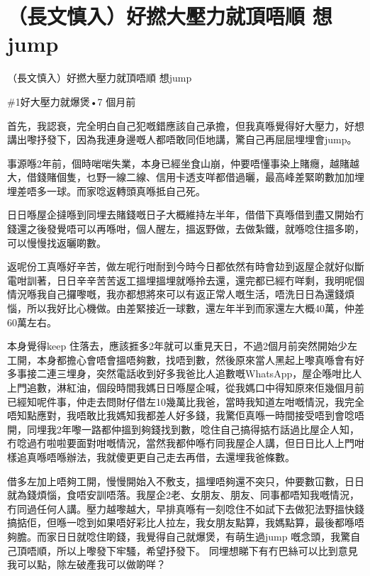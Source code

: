 \chapter{（長文慎入）好撚大壓力就頂唔順 想jump}

（長文慎入）好撚大壓力就頂唔順 想jump

\#1好大壓力就爆煲•7 個月前

首先，我認衰，完全明白自己犯嘅錯應該自己承擔，但我真喺覺得好大壓力，好想講出嚟抒發下，因為我連身邊嘅人都唔敢同佢地講，驚自己再屈屈埋埋會jump。

事源喺2年前，個時啱啱失業，本身已經坐食山崩，仲要唔懂事染上賭癮，越賭越大，借錢賭個隻，乜野一線二線、信用卡透支咩都借過曬，最高峰差緊啲數加加埋埋差唔多一球。而家唸返轉頭真喺抵自己死。

日日喺屋企撻喺到同埋去賭錢嘅日子大概維持左半年，借借下真喺借到盡又開始冇錢還之後發覺唔可以再喺咁，個人醒左，搵返野做，去做紮鐵，就喺唸住搵多啲，可以慢慢找返曬啲數。

返呢份工真喺好辛苦，做左呢行咁耐到今時今日都依然有時會攰到返屋企就好似斷電咁訓著，日日辛辛苦苦返工搵埋搵埋就喺拎去還，還完都已經冇咩剩，我明呢個情況喺我自己攞嚟嘅，我亦都想將來可以有返正常人嘅生活，唔洗日日為還錢煩惱，所以我好比心機做。由差緊接近一球數，還左年半到而家還左大概40萬，仲差60萬左右。

本身覺得keep 住落去，應該捱多2年就可以重見天日，不過2個月前突然開始少左工開，本身都擔心會唔會搵唔夠數，找唔到數，然後原來當人黑起上嚟真喺會有好多事接二連三埋身，突然電話收到好多我爸比人追數嘅WhatsApp，屋企喺咁比人上門追數，淋紅油，個段時間我媽日日喺屋企喊，從我媽口中得知原來佢幾個月前已經知呢件事，仲走去問財仔借左10幾萬比我爸，當時我知道左咁嘅情況，我完全唔知點應對，我唔敢比我媽知我都差人好多錢，我驚佢真喺一時間接受唔到會唸唔開，同埋我2年嚟一路都仲搵到夠錢找到數，唸住自己搞得掂冇話過比屋企人知，冇唸過冇啦啦要面對咁嘅情況，當然我都仲喺冇同我屋企人講，但日日比人上門咁樣追真喺唔喺辦法，我就傻更更自己走去再借，去還埋我爸條數。

借多左加上唔夠工開，慢慢開始入不敷支，搵埋唔夠還不突只，仲要數冚數，日日就為錢煩惱，食唔安訓唔落。我屋企2老、女朋友、朋友、同事都唔知我嘅情況，冇同過任何人講。壓力越嚟越大，早排真喺有一刻唸住不如試下去做犯法野搵快錢搞掂佢，但喺一唸到如果唔好彩比人拉左，我女朋友點算，我媽點算，最後都喺唔夠膽。而家日日就唸住啲錢，我覺得自己就爆煲，有萌生過jump 嘅念頭，我驚自己頂唔順，所以上嚟發下牢騷，希望抒發下。 同埋想睇下有冇巴絲可以比到意見我可以點，除左破產我可以做啲咩？

